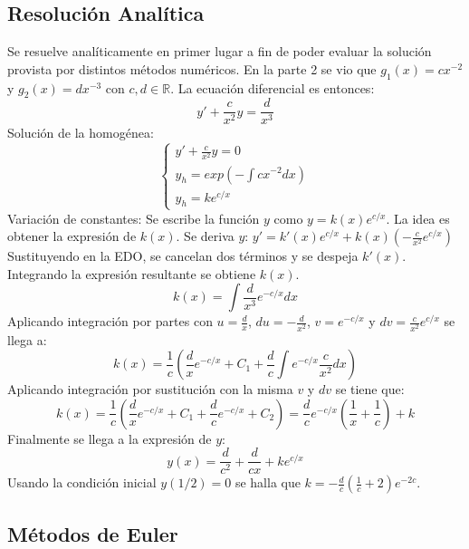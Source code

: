 \documentclass{endm}
\begin{document}
\subsection{Resolución Analítica}
Se resuelve analíticamente en primer lugar a fin de poder evaluar la solución provista por distintos métodos numéricos.
En la parte 2 se vio que $g_1(x) = cx^{-2}$ y $g_2(x) = dx^{-3}$ con $c,d \in \mathbb{R}$.
La ecuación diferencial es entonces:
\begin{equation}
    y' + \frac{c}{x^2}y = \frac{d}{x^3}
\end{equation}
Solución de la homogénea:
 \begin{equation*}
\begin{cases}
    y' + \frac{c}{x^2}y = 0 \\
    y_h = exp(-\int cx^{-2}dx) \\
    y_h = ke^{c/x}
\end{cases}
\end{equation*}
Variación de constantes:
Se escribe la función $y$ como $y = k(x)e^{c/x}$. La idea es obtener la expresión de $k(x)$.
Se deriva $y$: $y' = k'(x)e^{c/x} + k(x)\left(-\frac{c}{x^2}e^{c/x}\right)$
Sustituyendo en la EDO, se cancelan dos términos y se despeja $k'(x)$. Integrando la expresión resultante se obtiene $k(x)$.
\begin{equation}
    k(x) = \int \frac{d}{x^3}e^{-c/x}dx
\end{equation}
Aplicando integración por partes con $u = \frac{d}{x}$, $du = -\frac{d}{x^2}$, $v = e^{-c/x}$ y $dv = \frac{c}{x^2}e^{c/x}$ se llega a:
\begin{equation}
    k(x) = \frac{1}{c}\left( \frac{d}{x}e^{-c/x} + C_1 + \frac{d}{c}\int e^{-c/x}\frac{c}{x^2}dx \right)
\end{equation}
Aplicando integración por sustitución con la misma $v$ y $dv$ se tiene que:
\begin{equation}
    k(x) = \frac{1}{c}\left( \frac{d}{x}e^{-c/x} + C_1 + \frac{d}{c}e^{-c/x} + C_2 \right) =
    \frac{d}{c}e^{-c/x}\left( \frac{1}{x} + \frac{1}{c} \right) + k
\end{equation}
Finalmente se llega a la expresión de $y$:
\begin{equation}
    y(x) = \frac{d}{c^2} + \frac{d}{cx}+ ke^{c/x}
\end{equation}
Usando la condición inicial $y(1/2) = 0$ se halla que $k = -\frac{d}{c}\left( \frac{1}{c} + 2 \right)e^{-2c}$.

\subsection{Métodos de Euler}
\end{document}
